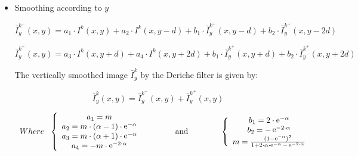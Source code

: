 \documentclass[twoside]{article}
\newcommand\Smo{\bar} %
\DeclareMathOperator{\e}{e}
\begin{document}
\begin{itemize}
	
	\item Smoothing according to $y$

		\begin{equation}
		\label{top-bottom}
			\Smo {I}^{k^-}_y(x,y)=a_1 \cdot I^k(x,y) + a_2 \cdot I^k(x,y-d) + b_1 \cdot \Smo {I}^{k^+}_y(x,y-d) + b_2 \cdot \Smo {I}^{k^+}_y(x,y-2d)
		\end{equation}
		
		
		
		\begin{equation}
		\label{bottom-top}
			\Smo {I}^{k^+}_y(x,y)=a_3 \cdot I^k(x,y+d) + a_4 \cdot I^k(x,y+2d) + b_1 \cdot \Smo {I}^{k^+}_y(x,y+d) + b_2 \cdot \Smo {I}^{k^+}_y(x,y+2d)
		\end{equation}
		
		The vertically smoothed image $\Smo {I}^{k}_y$  by the Deriche filter is given by:	
	
		
		\begin{equation}
			\Smo {I}^{k}_y(x,y)=\Smo {I}^{k^-}_y(x,y) + \Smo {I}^{k^+}_y(x,y)
		\end{equation}
	
	

	
		\begin{equation}
		\begin{array}{lcl}
			Where~~\left\lbrace
			\begin{array}{cl}
				a_1 = m\\ 
				a_2 = m \cdot (\alpha -1)\cdot \e ^{-\alpha} \\
				a_3 = m \cdot (\alpha +1)\cdot \e ^{-\alpha}\\
				a_4 =-m \cdot \e ^{-2 \cdot \alpha}\\
			\end{array}\right.
			& \text{\hspace{1cm} and \hspace{1cm}} &
			\left\lbrace
			\begin{array}{cl}
				b_1 = 2\cdot \e ^{-\alpha}\\ 
				b_2 = -\e ^{-2 \cdot \alpha} \\
				m=\frac{(1-\e^{-\alpha})^2}{1+2 \cdot \alpha \cdot \e^{-\alpha}- \e ^{-2\cdot \alpha}}\\
			\end{array}\right.
		\end{array}
		\label{eq:parametre Deriche}
		\end{equation}
	
	
	
	
	
	
 \end{itemize}
\end{document}
